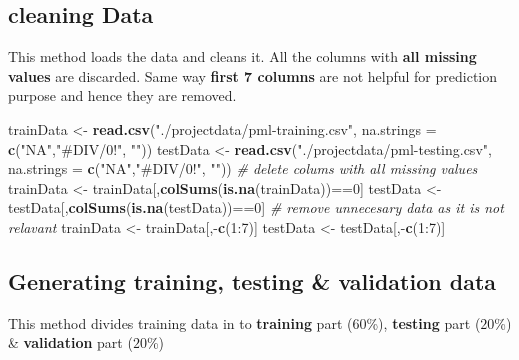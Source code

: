 \documentclass[]{article}
\newenvironment{Shaded}{\begin{snugshade}}{\end{snugshade}}
\newcommand{\KeywordTok}[1]{\textcolor[rgb]{0.13,0.29,0.53}{\textbf{{#1}}}}
\newcommand{\DataTypeTok}[1]{\textcolor[rgb]{0.13,0.29,0.53}{{#1}}}
\newcommand{\DecValTok}[1]{\textcolor[rgb]{0.00,0.00,0.81}{{#1}}}
\newcommand{\StringTok}[1]{\textcolor[rgb]{0.31,0.60,0.02}{{#1}}}
\newcommand{\CommentTok}[1]{\textcolor[rgb]{0.56,0.35,0.01}{\textit{{#1}}}}
\newcommand{\NormalTok}[1]{{#1}}
\begin{document}
\subsection{cleaning Data}\label{cleaning-data}

This method loads the data and cleans it. All the columns with
\textbf{all missing values} are discarded. Same way \textbf{first 7
columns} are not helpful for prediction purpose and hence they are
removed.

\begin{Shaded}
\begin{Highlighting}[]
\NormalTok{trainData <-}\StringTok{ }\KeywordTok{read.csv}\NormalTok{(}\StringTok{"./projectdata/pml-training.csv"}\NormalTok{, }
                      \DataTypeTok{na.strings =} \KeywordTok{c}\NormalTok{(}\StringTok{"NA"}\NormalTok{,}\StringTok{"#DIV/0!"}\NormalTok{, }\StringTok{""}\NormalTok{))}
\NormalTok{testData <-}\StringTok{ }\KeywordTok{read.csv}\NormalTok{(}\StringTok{"./projectdata/pml-testing.csv"}\NormalTok{,}
                     \DataTypeTok{na.strings =} \KeywordTok{c}\NormalTok{(}\StringTok{"NA"}\NormalTok{,}\StringTok{"#DIV/0!"}\NormalTok{, }\StringTok{""}\NormalTok{))}
\CommentTok{# delete colums with all missing values}
\NormalTok{trainData <-}\StringTok{ }\NormalTok{trainData[,}\KeywordTok{colSums}\NormalTok{(}\KeywordTok{is.na}\NormalTok{(trainData))==}\DecValTok{0}\NormalTok{]}
\NormalTok{testData <-}\StringTok{ }\NormalTok{testData[,}\KeywordTok{colSums}\NormalTok{(}\KeywordTok{is.na}\NormalTok{(testData))==}\DecValTok{0}\NormalTok{]}
\CommentTok{# remove unnecesary data as it is not relavant}
\NormalTok{trainData <-}\StringTok{ }\NormalTok{trainData[,-}\KeywordTok{c}\NormalTok{(}\DecValTok{1}\NormalTok{:}\DecValTok{7}\NormalTok{)]}
\NormalTok{testData <-}\StringTok{ }\NormalTok{testData[,-}\KeywordTok{c}\NormalTok{(}\DecValTok{1}\NormalTok{:}\DecValTok{7}\NormalTok{)]}
\end{Highlighting}
\end{Shaded}

\subsection{Generating training, testing \& validation
data}\label{generating-training-testing-validation-data}

This method divides training data in to \textbf{training} part
(\(60\)\%), \textbf{testing} part (\(20\)\%) \& \textbf{validation} part
(\(20\)\%)
\end{document}
